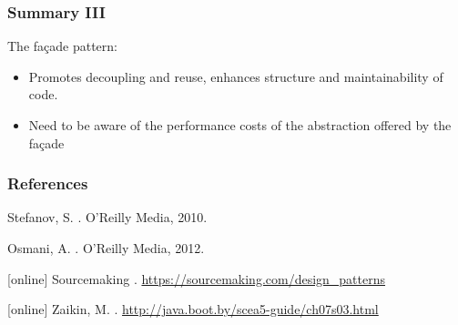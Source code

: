 \documentclass{beamer}
\begin{document}
\begin{frame}[fragile]
\frametitle{Summary III}
 The fa\c{c}ade pattern:
\begin{itemize}
  \item Promotes decoupling and reuse, enhances structure and maintainability of code.
  \item Need to be aware of the performance costs of the abstraction offered by the fa\c{c}ade
  \end{itemize}
\end{frame}

\begin{frame}
  \frametitle{References}    
  \begin{thebibliography}{5}    
  
  \beamertemplatebookbibitems
   Stefanov, S.
    .
    \newblock O'Reilly Media, 2010.
  
  \beamertemplatebookbibitems
   Osmani, A.
    .
    \newblock O'Reilly Media, 2012.
  
  [online]
   Sourcemaking
  .
  \newblock \url{https://sourcemaking.com/design_patterns}
  
  [online]
   Zaikin, M. 
  .
  \newblock \url{http://java.boot.by/scea5-guide/ch07s03.html}
 
  \end{thebibliography}
\end{frame}
\end{document}
